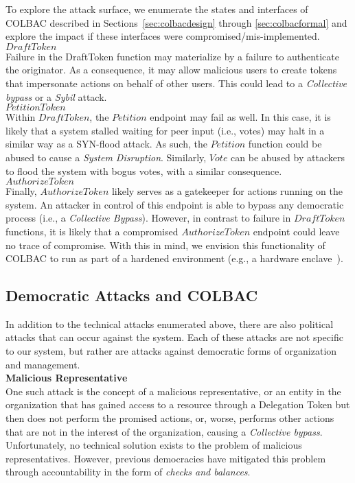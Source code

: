 To explore the attack surface, we enumerate the states and interfaces of
COLBAC described in Sections~\ref{sec:colbacdesign} through 
\ref{sec:colbacformal} and explore the impact if these interfaces were
compromised/mis-implemented.\\

\noindent$DraftToken$\mbox{}\\
Failure in the DraftToken function may materialize by a failure to authenticate
the originator. As a consequence, it may allow malicious users to create tokens
that impersonate actions on behalf of other users. This could lead to a
\emph{Collective bypass} or a \emph{Sybil} attack.\\

\noindent$PetitionToken$\mbox{}\\
Within $DraftToken$, the $Petition$ endpoint may fail as well. In this case, it
is likely that a system stalled waiting for peer input (i.e., votes) may halt
in a similar way as a SYN-flood attack. As such, the $Petition$ function could
be abused to cause a \emph{System Disruption}. Similarly, $Vote$ can be abused
by attackers to flood the system with bogus votes, with a similar consequence.\\

\noindent$AuthorizeToken$\mbox{}\\
Finally, $AuthorizeToken$ likely serves as a gatekeeper for actions running on
the system. An attacker in control of this endpoint is able to bypass any
democratic process (i.e., a \emph{Collective Bypass}). However, in contrast to
failure in $DraftToken$ functions, it is likely that a compromised
$AuthorizeToken$ endpoint could leave no trace of compromise. With this in
mind, we envision this functionality of COLBAC to run as part of a hardened
environment (e.g., a hardware enclave~\cite{sgx}).

\subsection{Democratic Attacks and COLBAC}
In addition to the technical attacks enumerated above, there are also political
attacks that can occur against the system. Each of these attacks are not
specific to our system, but rather are attacks against democratic forms of
organization and management.\\

\noindent\textbf{Malicious Representative}\mbox{}\\
One such attack is the concept of a malicious representative, or an entity in
the organization that has gained access to a resource through a Delegation Token
but then does not perform the promised actions, or, worse, performs other
actions that are not in the interest of the organization, causing a
\emph{Collective bypass}. Unfortunately, no technical solution exists to the
problem of malicious representatives. However, previous democracies have
mitigated this problem through accountability in the form of \emph{checks and
balances}.

